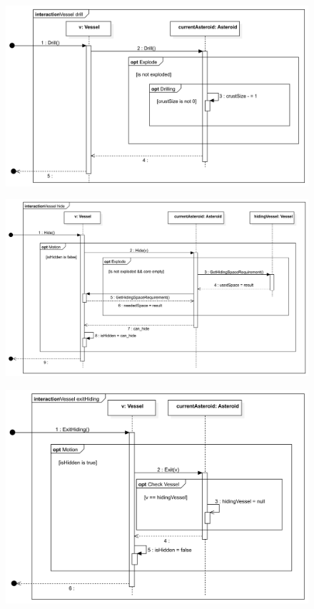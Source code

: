 \begin{figure}[H] 
\centering 
\includegraphics[width=1\textwidth]{docs/3_Project/svg/Design Model!Vessel Actions!Vessel drill!Vessel drill_12.png} 
\end{figure} 

\begin{figure}[H] 
\centering 
\includegraphics[width=1\textwidth]{docs/3_Project/svg/Design Model!Vessel Actions!Vessel hide!Vessel hide_13.png} 
\end{figure} 

\begin{figure}[H] 
\centering 
\includegraphics[width=1\textwidth]{docs/3_Project/svg/Design Model!Vessel Actions!Vessel exitHiding!Vessel exitHiding_14.png} 
\end{figure} 

